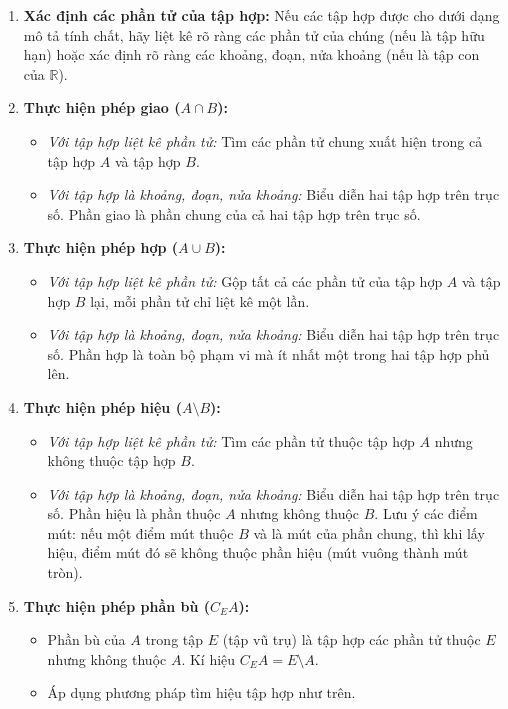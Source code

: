 \begin{phuongphap}
\begin{enumerate}
    \item \textbf{Xác định các phần tử của tập hợp:} Nếu các tập hợp được cho dưới dạng mô tả tính chất, hãy liệt kê rõ ràng các phần tử của chúng (nếu là tập hữu hạn) hoặc xác định rõ ràng các khoảng, đoạn, nửa khoảng (nếu là tập con của $\mathbb{R}$).
    \item \textbf{Thực hiện phép giao ($A \cap B$):}
    \begin{itemize}
        \item \textit{Với tập hợp liệt kê phần tử:} Tìm các phần tử chung xuất hiện trong cả tập hợp $A$ và tập hợp $B$.
        \item \textit{Với tập hợp là khoảng, đoạn, nửa khoảng:} Biểu diễn hai tập hợp trên trục số. Phần giao là phần chung của cả hai tập hợp trên trục số.
    \end{itemize}
    \item \textbf{Thực hiện phép hợp ($A \cup B$):}
    \begin{itemize}
        \item \textit{Với tập hợp liệt kê phần tử:} Gộp tất cả các phần tử của tập hợp $A$ và tập hợp $B$ lại, mỗi phần tử chỉ liệt kê một lần.
        \item \textit{Với tập hợp là khoảng, đoạn, nửa khoảng:} Biểu diễn hai tập hợp trên trục số. Phần hợp là toàn bộ phạm vi mà ít nhất một trong hai tập hợp phủ lên.
    \end{itemize}
    \item \textbf{Thực hiện phép hiệu ($A \setminus B$):}
    \begin{itemize}
        \item \textit{Với tập hợp liệt kê phần tử:} Tìm các phần tử thuộc tập hợp $A$ nhưng không thuộc tập hợp $B$.
        \item \textit{Với tập hợp là khoảng, đoạn, nửa khoảng:} Biểu diễn hai tập hợp trên trục số. Phần hiệu là phần thuộc $A$ nhưng không thuộc $B$. Lưu ý các điểm mút: nếu một điểm mút thuộc $B$ và là mút của phần chung, thì khi lấy hiệu, điểm mút đó sẽ không thuộc phần hiệu (mút vuông thành mút tròn).
    \end{itemize}
    \item \textbf{Thực hiện phép phần bù ($C_E A$):}
    \begin{itemize}
        \item Phần bù của $A$ trong tập $E$ (tập vũ trụ) là tập hợp các phần tử thuộc $E$ nhưng không thuộc $A$. Kí hiệu $C_E A = E \setminus A$.
        \item Áp dụng phương pháp tìm hiệu tập hợp như trên.
    \end{itemize}
\end{enumerate}
\end{phuongphap}


